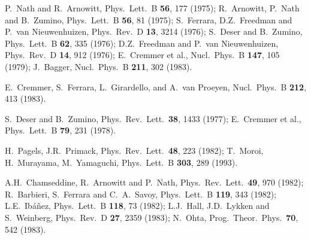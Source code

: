 \documentclass[11pt]{article}
\begin{document}
\begin{thebibliography}{999}
P.~Nath and R.~Arnowitt,
  Phys.\ Lett.\ B {\bf 56}, 177 (1975);
R.~Arnowitt, P.~Nath and B.~Zumino,
  Phys.\ Lett.\ B {\bf 56}, 81 (1975);
S.~Ferrara, D.Z.~Freedman and P.~van Nieuwenhuizen,
  Phys.\ Rev.\ D {\bf 13}, 3214 (1976);
S.~Deser and B.~Zumino,
  Phys.\ Lett.\ B {\bf 62}, 335 (1976);
D.Z.~Freedman and  P.~van Nieuwenhuizen, 
  Phys.\ Rev.\ D {\bf 14}, 912 (1976);
E.~Cremmer et al.,
  Nucl.\ Phys.\ B {\bf 147}, 105 (1979);
J.~Bagger, 
  Nucl.\ Phys.\ B {\bf 211}, 302 (1983).

E.~Cremmer, S.~Ferrara, L.~Girardello, and A.~van Proeyen,
  Nucl.\ Phys.\ B {\bf 212}, 413 (1983).

S.~Deser and B.~Zumino,
  Phys.\ Rev.\ Lett.\  {\bf 38}, 1433 (1977);
E.~Cremmer et al.,
  Phys.\ Lett.\ B {\bf 79}, 231 (1978).

H.~Pagels, J.R.~Primack, 
  Phys.\ Rev.\ Lett.\  {\bf 48}, 223 (1982);
T.~Moroi, H.~Murayama, M.~Yamaguchi, 
  Phys.\ Lett.\ B {\bf 303}, 289 (1993).

  A.H.~Chamseddine, R.~Arnowitt and P.~Nath,
  Phys.\ Rev.\ Lett.\  {\bf 49}, 970 (1982);
  R.~Barbieri, S.~Ferrara and C.~A.~Savoy,
  Phys.\ Lett.\ B {\bf 119}, 343 (1982);
  L.E.~Ib\'a\~nez, 
  Phys.\ Lett.\ B {\bf 118}, 73 (1982);
  L.J.~Hall, J.D.~Lykken and S.~Weinberg, 
  Phys.\ Rev.\ D {\bf 27}, 2359 (1983);
  N.~Ohta,
  Prog.\ Theor.\ Phys.\  {\bf 70}, 542 (1983).


\end{thebibliography}
\end{document}
